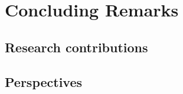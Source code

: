 \chapter{Concluding Remarks} 	

{\textcolor{red}{ \lipsum[1]}}


\section{Research contributions} 

{\textcolor{red}{ \lipsum[1]}}



\section{Perspectives} 	
{\textcolor{red}{ \lipsum[1]}}
\newpage
